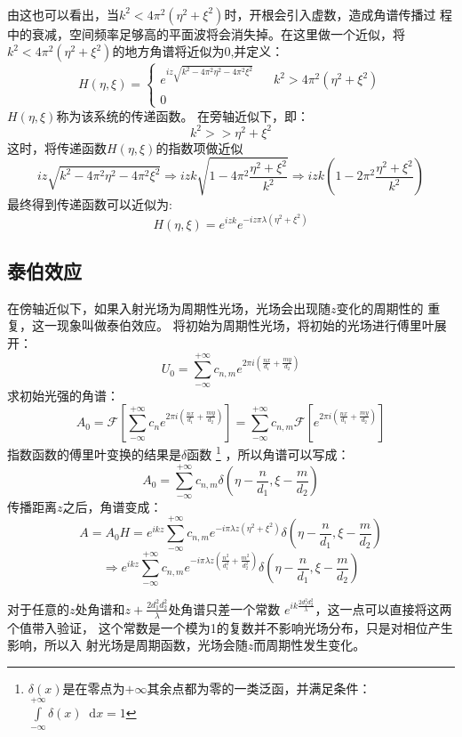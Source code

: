 \documentclass{article}
\newcommand*{\dif}{\mathop{}\!\mathrm{d}}
\begin{document}
\paragraph{}
由这也可以看出，当$k^2<4\pi^{2}(\eta^2+\xi^2)$时，开根会引入虚数，造成角谱传播过
程中的衰减，空间频率足够高的平面波将会消失掉。在这里做一个近似，将
$k^2<4\pi^2(\eta^2+\xi^2)$的地方角谱将近似为0,并定义：
\begin{equation}
  \label{eq:4}
  H(\eta,\xi)=\left \{
    \begin{array}{rcl}
      e^{iz \sqrt{k^2-4\pi^2\eta^2-4\pi^2\xi^2}}&&{k^2>4\pi^2(\eta^2+\xi^2)}\\
      0&&{}
    \end{array}
  \right
  .
\end{equation}
$H(\eta,\xi)$称为该系统的传递函数。
在旁轴近似下，即：
\[k^2>>\eta^2+\xi^2\]这时，将传递函数$H(\eta,\xi)$的指数项做近似
\[iz \sqrt{k^2-4\pi^2\eta^2-4\pi^2\xi^2}\Rightarrow izk
  \sqrt{1-4\pi^2\frac{\eta^2+\xi^2}{k^{2}}}\Rightarrow
  izk(1-2\pi^2\frac{\eta^2+\xi^2}{k^{2}})\]
最终得到传递函数可以近似为:
\begin{equation}
  \label{eq:5}
  H(\eta,\xi)=e^{izk}e^{-iz\pi\lambda(\eta^2+\xi^2)}
\end{equation}
\subsection{泰伯效应}
在傍轴近似下，如果入射光场为周期性光场，光场会出现随$z$变化的周期性的
重复，这一现象叫做泰伯效应。
将初始为周期性光场，将初始的光场进行傅里叶展开：
\[U_0=\sum_{-\infty}^{+\infty}c_{n,m}e^{2\pi i(\frac{nx}{d_1}+\frac{my}{d_2})} \]
求初始光强的角谱：
\[A_0=\mathscr{F}[\sum_{-\infty}^{+\infty}c_ne^{2\pi
    i(\frac{nx}{d_1}+\frac{my}{d_2})}]=\sum_{-\infty}^{+\infty}c_{n,m}\mathscr{F}[e^{2\pi
    i(\frac{nx}{d_1}+\frac{my}{d_2})}]\]
指数函数的傅里叶变换的结果是$\delta$函数
\footnote{
  $\delta(x)$是在零点为$+\infty$其余点都为零的一类泛函，并满足条件：
  $\int\limits_{-\infty}^{+\infty}\delta(x)\dif x=1$
}
，所以角谱可以写成：
\[A_0=\sum_{-\infty}^{+\infty}c_{n,m}\delta(\eta-\frac{n}{d_1},\xi-\frac{m}{d_2})\]
传播距离$z$之后，角谱变成：
\[A=A_0H=e^{ikz}\sum_{-\infty}^{+\infty}c_{n,m}e^{-i\pi\lambda
    z(\eta^2+\xi^2)}\delta(\eta-\frac{n}{d_1},\xi-\frac{m}{d_2})\]
\[\Rightarrow e^{ikz}\sum_{-\infty}^{+\infty}c_{n,m}e^{-i\pi\lambda
    z(\frac{n^2}{d_1^2}+\frac{m^2}{d_2^2})}\delta(\eta-\frac{n}{d_1},\xi-\frac{m}{d_2})\]

对于任意的$z$处角谱和$z+\frac{2d_1^2d_2^2}{\lambda}$处角谱只差一个常数
$e^{ik \frac{2d_1^2d_2^2}{\lambda}}$，这一点可以直接将这两个值带入验证，
这个常数是一个模为1的复数并不影响光场分布，只是对相位产生影响，所以入
射光场是周期函数，光场会随$z$而周期性发生变化。
\end{document}
